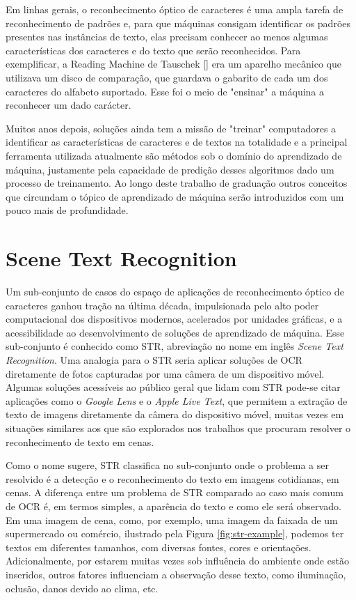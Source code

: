 Em linhas gerais, o reconhecimento óptico de caracteres é uma ampla tarefa de reconhecimento de padrões e, para que máquinas consigam identificar 
os padrões presentes nas instâncias de texto, elas precisam conhecer ao menos algumas características dos caracteres e do texto que serão 
reconhecidos. Para exemplificar, a Reading Machine de Tauschek [] era um aparelho mecânico que utilizava um disco de 
comparação, que guardava o gabarito de cada um dos caracteres do alfabeto suportado. Esse foi o meio de "ensinar" a máquina a reconhecer um dado carácter.

Muitos anos depois, soluções ainda tem a missão de "treinar" computadores a identificar as características de caracteres e de textos na totalidade 
e a principal ferramenta utilizada atualmente são métodos sob o domínio do aprendizado de máquina, justamente pela capacidade de predição desses 
algoritmos dado um processo de treinamento. Ao longo deste trabalho de graduação outros conceitos que circundam o tópico de aprendizado de máquina 
serão introduzidos com um pouco mais de profundidade.

\section{Scene Text Recognition}

Um sub-conjunto de casos do espaço de aplicações de reconhecimento óptico de caracteres ganhou tração na última década, impulsionada pelo 
alto poder computacional dos dispositivos modernos, acelerados por unidades gráficas, e a acessibilidade ao desenvolvimento de soluções de aprendizado 
de máquina. Esse sub-conjunto é conhecido como STR, abreviação no nome em inglês \textit{Scene Text Recognition}. Uma analogia para o STR seria 
aplicar soluções de OCR diretamente de fotos capturadas por uma câmera de um dispositivo móvel. Algumas soluções acessíveis ao público geral que lidam 
com STR pode-se citar aplicações como o \textit{Google Lens} e o \textit{Apple Live Text}, que permitem a extração de texto de imagens diretamente 
da câmera do dispositivo móvel, muitas vezes em situações similares aos que são explorados nos trabalhos que procuram resolver o reconhecimento 
de texto em cenas.

Como o nome sugere, STR classifica no sub-conjunto onde o problema a ser resolvido é a detecção e o reconhecimento do texto em imagens cotidianas, em cenas. 
A diferença entre um problema de STR comparado ao caso mais comum de OCR é, em termos simples, a aparência do texto e como ele será observado. 
Em uma imagem de cena, como, por exemplo, uma imagem da faixada de um supermercado ou comércio, ilustrado pela Figura \ref{fig:str-example}, podemos 
ter textos em diferentes tamanhos, com diversas fontes, cores e orientações. Adicionalmente, por estarem muitas vezes sob influência do ambiente onde 
estão inseridos, outros fatores influenciam a observação desse texto, como iluminação, oclusão, danos devido ao clima, etc.

